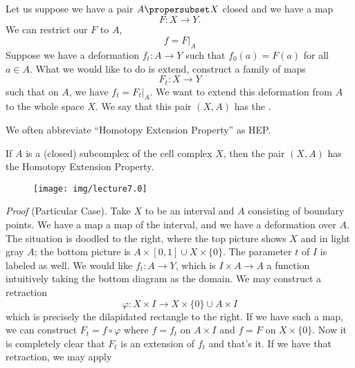 
\begin{lem}
Let us suppose we have a pair $A\propersubset X$ closed and we
have a map
\begin{equation}
F\colon X\to Y.
\end{equation}
We can restrict our $F$ to $A$,
\begin{equation}
f=\left.F\right|_{A}
\end{equation}
Suppose we have a deformation $f_{t}\colon A\to Y$ such that
$f_{0}(a)=F(a)$ for all $a\in A$. What we would like to do is
extend, construct a family of maps
\begin{equation}
F_{t}\colon X\to Y
\end{equation}
such that on $A$, we have $f_{t}=\left.F_{t}\right|_{A}$. We want
to extend this deformation from $A$ to the whole space $X$. We
say that this pair $(X,A)$ has the .%
\end{lem}
\begin{rmk}
We often abbreviate ``Homotopy Extension Property'' as HEP.
\end{rmk}
\begin{lem}
If $A$ is a (closed) subcomplex of the cell complex $X$, then the
pair $(X,A)$ has the Homotopy Extension Property.
\end{lem}

\begin{wrapfigure}{r}{1.06in}
  \vspace{-20pt}
  \texttt{[image: img/lecture7.0]}
\end{wrapfigure}
\noindent\emph{Proof} (Particular Case).
Take $X$ to be an interval and $A$ consisting of boundary
points. We have a map a map of the interval, and we have a
deformation over $A$. The situation is doodled to the right,
where the top picture shows $X$ and in light gray $A$; the bottom
picture is $A\times[0,1]\cup X\times\{0\}$. The parameter $t$ of
$I$ is labeled as well.
We would like $f_{t}\colon A\to Y$, which is $I\times A\to A$ a
function intuitively taking the bottom diagram as the domain. We
may construct a retraction
\begin{equation}
\varphi\colon X\times I\to X\times\{0\}\cup A\times I
\end{equation}
which is precisely the dilapidated rectangle to the right. If we
have such a map, we can construct $F_{t}=f\circ\varphi$ where
$f=f_{t}$ on $A\times I$ and $f=F$ on $X\times\{0\}$. Now it is
completely clear that $F_{t}$ is an extension of $f_{t}$ and
that's it. If we have that retraction, we may apply 

